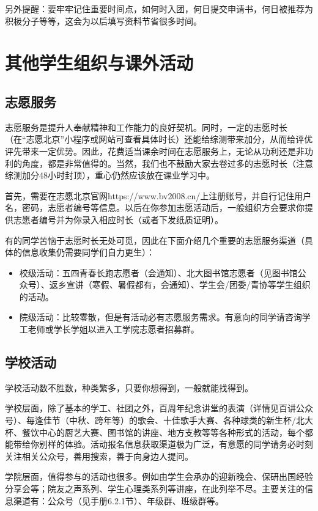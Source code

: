 \documentclass[11pt,oneside]{book}
\begin{document}
另外提醒：要牢牢记住重要时间点，如何时入团，何日提交申请书，何日被推荐为积极分子等等，这会为以后填写资料节省很多时间。

    \section{其他学生组织与课外活动}
\subsection{志愿服务}
志愿服务是提升人奉献精神和工作能力的良好契机。同时，一定的志愿时长（在“志愿北京”小程序或网站可查看具体时长）还能给综测带来加分，从而给评优评先带来一定优势。因此，花费适当课余时间在志愿服务上，无论从功利还是非功利的角度，都是非常值得的。当然，我们也不鼓励大家去卷过多的志愿时长（注意综测加分48小时封顶），重心仍然应该放在课业学习中。

首先，需要在志愿北京官网https://www.bv2008.cn/上注册账号，并自行记住用户名，密码，志愿者编号等信息。以后在你参加志愿活动后，一般组织方会要求你提供志愿者编号并为你录入相应时长（或者下发纸质证明）。

有的同学苦恼于志愿时长无处可觅，因此在下面介绍几个重要的志愿服务渠道（具体的信息收集仍需要同学们自力更生）：
\begin{itemize}
    \item 校级活动：五四青春长跑志愿者（会通知）、北大图书馆志愿者（见图书馆公众号）、返乡宣讲（寒假、暑假都有，会通知）、学生会/团委/青协等学生组织的活动。
    \item 院级活动：比较零散，但是有活动必有志愿服务需求。有意向的同学请咨询学工老师或学长学姐以进入工学院志愿者招募群。
\end{itemize}




\subsection{学校活动}
学校活动数不胜数，种类繁多，只要你想得到，一般就能找得到。

学校层面，除了基本的学工、社团之外，百周年纪念讲堂的表演（详情见百讲公众号）、每逢佳节（中秋、跨年等）的歌会、十佳歌手大赛、各种球类的新生杯/北大杯、餐饮中心的厨艺大赛、图书馆的讲座、地方支教等等各种形式的活动，每个都能带给你别样的体验。活动报名信息获取渠道极为广泛，有意愿的同学请务必时刻关注相关公众号，善用搜索，善于向身边人提问。

学院层面，值得参与的活动也很多。例如由学生会承办的迎新晚会、保研出国经验分享会等；院友之声系列、学生心理类系列等讲座，在此列举不尽。主要关注的信息渠道有：公众号（见手册6.2.1节）、年级群、班级群等。
\end{document}
